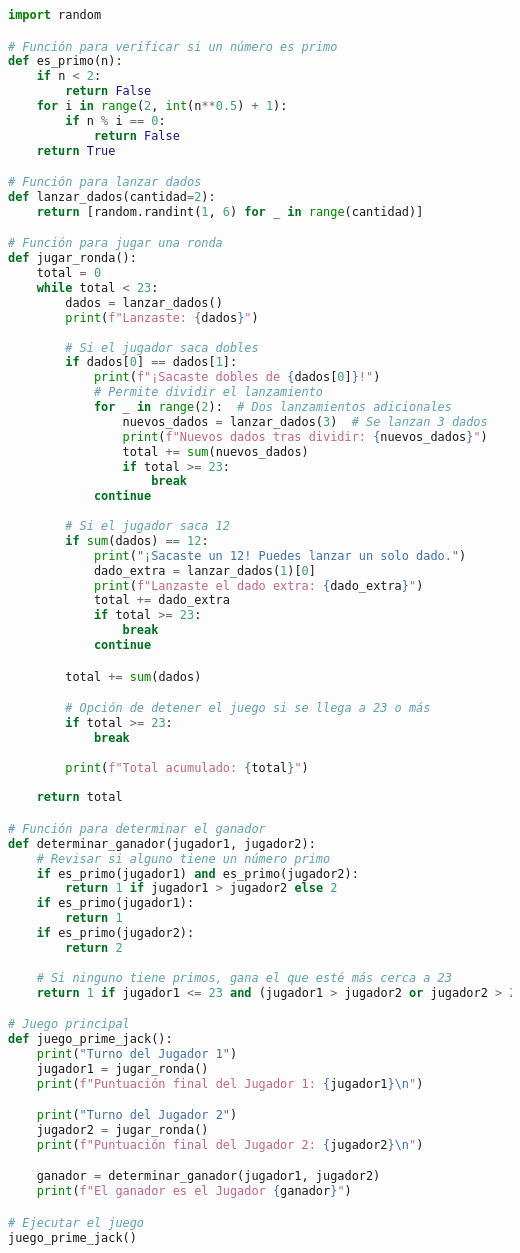 \documentclass{article}
\begin{document}
\begin{lstlisting}[language=Python, caption=Código en Python]
import random

# Función para verificar si un número es primo
def es_primo(n):
    if n < 2:
        return False
    for i in range(2, int(n**0.5) + 1):
        if n % i == 0:
            return False
    return True

# Función para lanzar dados
def lanzar_dados(cantidad=2):
    return [random.randint(1, 6) for _ in range(cantidad)]

# Función para jugar una ronda
def jugar_ronda():
    total = 0
    while total < 23:
        dados = lanzar_dados()
        print(f"Lanzaste: {dados}")
        
        # Si el jugador saca dobles
        if dados[0] == dados[1]:
            print(f"¡Sacaste dobles de {dados[0]}!")
            # Permite dividir el lanzamiento
            for _ in range(2):  # Dos lanzamientos adicionales
                nuevos_dados = lanzar_dados(3)  # Se lanzan 3 dados
                print(f"Nuevos dados tras dividir: {nuevos_dados}")
                total += sum(nuevos_dados)
                if total >= 23:
                    break
            continue
        
        # Si el jugador saca 12
        if sum(dados) == 12:
            print("¡Sacaste un 12! Puedes lanzar un solo dado.")
            dado_extra = lanzar_dados(1)[0]
            print(f"Lanzaste el dado extra: {dado_extra}")
            total += dado_extra
            if total >= 23:
                break
            continue

        total += sum(dados)

        # Opción de detener el juego si se llega a 23 o más
        if total >= 23:
            break
        
        print(f"Total acumulado: {total}")
    
    return total

# Función para determinar el ganador
def determinar_ganador(jugador1, jugador2):
    # Revisar si alguno tiene un número primo
    if es_primo(jugador1) and es_primo(jugador2):
        return 1 if jugador1 > jugador2 else 2
    if es_primo(jugador1):
        return 1
    if es_primo(jugador2):
        return 2
    
    # Si ninguno tiene primos, gana el que esté más cerca a 23
    return 1 if jugador1 <= 23 and (jugador1 > jugador2 or jugador2 > 23) else 2

# Juego principal
def juego_prime_jack():
    print("Turno del Jugador 1")
    jugador1 = jugar_ronda()
    print(f"Puntuación final del Jugador 1: {jugador1}\n")

    print("Turno del Jugador 2")
    jugador2 = jugar_ronda()
    print(f"Puntuación final del Jugador 2: {jugador2}\n")

    ganador = determinar_ganador(jugador1, jugador2)
    print(f"El ganador es el Jugador {ganador}")

# Ejecutar el juego
juego_prime_jack()


\end{lstlisting}
\end{document}
